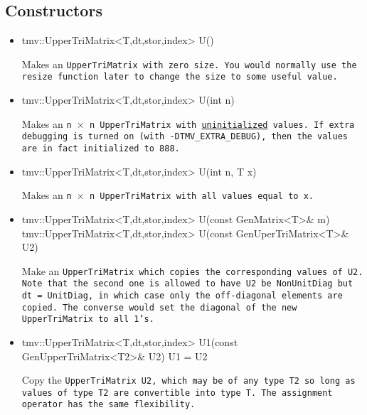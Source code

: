 \subsection{Constructors}
\label{TriMatrix_Constructors}

\begin{itemize}

\item
\begin{tmvcode}
tmv::UpperTriMatrix<T,dt,stor,index> U()
\end{tmvcode}
Makes an \tt{UpperTriMatrix} with zero size.  You would normally use the \tt{resize} function later to
change the size to some useful value.

\item 
\begin{tmvcode}
tmv::UpperTriMatrix<T,dt,stor,index> U(int n)
\end{tmvcode}
Makes an \tt{n} $\times$ \tt{n} \tt{UpperTriMatrix} with \underline{uninitialized} values.
If extra debugging is turned on (with \tt{-DTMV\_EXTRA\_DEBUG}), then the values are in fact initialized to 888.  

\item
\begin{tmvcode}
tmv::UpperTriMatrix<T,dt,stor,index> U(int n, T x)
\end{tmvcode}
Makes an \tt{n} $\times$ \tt{n} \tt{UpperTriMatrix} with all values equal to \tt{x}.

\item 
\begin{tmvcode}
tmv::UpperTriMatrix<T,dt,stor,index> U(const GenMatrix<T>& m)
tmv::UpperTriMatrix<T,dt,stor,index> U(const GenUperTriMatrix<T>& U2)
\end{tmvcode}
Make an \tt{UpperTriMatrix} which copies the corresponding values of
\tt{U2}.  Note that the second one is allowed to have \tt{U2} be
\tt{NonUnitDiag} but \tt{dt = UnitDiag}, in which case only the 
off-diagonal elements are copied.  The converse would set the 
diagonal of the new \tt{UpperTriMatrix} to all 1's.

\item
\begin{tmvcode}
tmv::UpperTriMatrix<T,dt,stor,index> U1(const GenUpperTriMatrix<T2>& U2)
U1 = U2
\end{tmvcode}
Copy the \tt{UpperTriMatrix U2}, which may be of any type \tt{T2} so long
as values of type \tt{T2} are convertible into type \tt{T}.
The assignment operator has the same flexibility.


\end{itemize}
